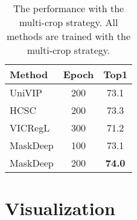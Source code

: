 \documentclass[10pt,twocolumn,letterpaper]{article}
\begin{document}
\begin{table}[h]
\centering
\caption{The performance with the multi-crop strategy. All methods are trained with the multi-crop strategy.}
\begin{tabular}{lcc}
\toprule
Method  & Epoch & Top1 \\
\midrule 
UniVIP & 200 & 73.1 \\ 
HCSC   & 200 & 73.3 \\ 
VICRegL\cite{bardes2022vicregl}  & 300 &  71.2 \\
MaskDeep  & 100 & 73.1 \\
MaskDeep  & 200 & \textbf{74.0} \\
\bottomrule
\end{tabular}
\label{tab:mc}
\end{table}

\section{Visualization}
\end{document}
